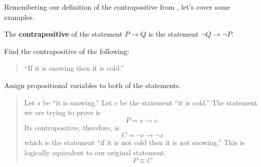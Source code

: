 Remembering our definition of the contrapositive from ,
let's cover some examples.

\begin{defn}
  The \textbf{contrapositive} of the statement $P \to Q$
  is the statement $\neg Q \to \neg P$.
\end{defn}

\begin{ex}
  Find the contrapositive of the following:
  \begin{quote}
    ``If it is snowing then it is cold.''
  \end{quote}
  \begin{sol}
    Assign propositional variables to both of the statements.
    \begin{quote}
      Let $s$ be ``it is snowing.'' Let $c$ be the statement ``it is cold.''
      The statement we are trying to prove is
      \[ P = s\to c.\]
      Its contrapositive, therefore, is
      \[ C = \neg c \to \neg s \]
      which is the statement ``if it is not cold then it is not snowing.''
      This is logically equivalent to our original statement.
      \[ P \equiv C \]
    \end{quote}
  \end{sol}
\end{ex}
